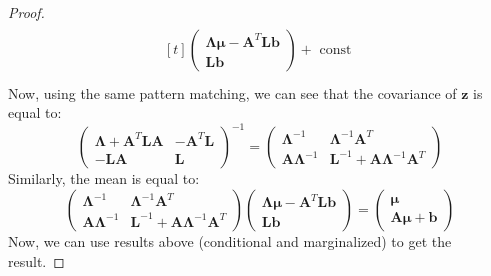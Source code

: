 \begin{proof}
\begin{equation*}
\begin{aligned}
\begin{aligned}[t]
\begin{pmatrix}
            \boldsymbol \Lambda \boldsymbol \mu - \boldsymbol A^T\boldsymbol L\boldsymbol b \\ \boldsymbol L\boldsymbol b
        \end{pmatrix}
        + \text{ const }
        \end{aligned} \\ 
    \end{aligned}
    \end{equation*}
    Now, using the same pattern matching, we can see that the covariance of $\boldsymbol z$ is equal to:
    \begin{equation*}
    \begin{pmatrix}
        \boldsymbol \Lambda + \boldsymbol A^T\boldsymbol L\boldsymbol A & - \boldsymbol A^T\boldsymbol L \\
        -\boldsymbol L\boldsymbol A & \boldsymbol L
    \end{pmatrix}^{-1} = 
    \begin{pmatrix}
        \boldsymbol \Lambda^{-1} & \boldsymbol \Lambda^{-1}\boldsymbol A^T \\
        \boldsymbol A\boldsymbol \Lambda^{-1} & \boldsymbol L^{-1} + \boldsymbol A\boldsymbol \Lambda^{-1}\boldsymbol A^T
    \end{pmatrix} 
    \end{equation*}
    Similarly, the mean is equal to:
    \begin{equation*}
        \begin{pmatrix}
            \boldsymbol \Lambda^{-1} & \boldsymbol \Lambda^{-1}\boldsymbol A^T \\
            \boldsymbol A\boldsymbol \Lambda^{-1} & \boldsymbol L^{-1} + \boldsymbol A\boldsymbol \Lambda^{-1}\boldsymbol A^T
        \end{pmatrix}
        \begin{pmatrix}
            \boldsymbol \Lambda \boldsymbol \mu - \boldsymbol A^T\boldsymbol L\boldsymbol b \\ \boldsymbol L\boldsymbol b
        \end{pmatrix} = \begin{pmatrix}
            \boldsymbol \mu \\ \boldsymbol A\boldsymbol \mu + \boldsymbol b
        \end{pmatrix}
    \end{equation*}
    Now, we can use results above (conditional and marginalized) to get the result. 
\end{proof}


